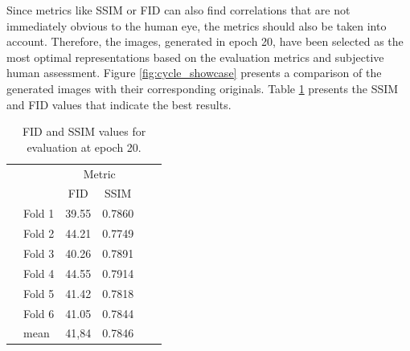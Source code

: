 Since metrics like SSIM or FID can also find correlations that are not immediately obvious to the human eye, the metrics should also be taken into account.
Therefore, the images, generated in epoch 20, have been selected as the most optimal representations based on the evaluation metrics and subjective human assessment.
Figure \ref{fig:cycle_showcase} presents a comparison of the generated images with their corresponding originals.
Table \ref{fid_ssim_cycle_table} presents the SSIM and FID values that indicate the best results.
\begin{table}[!tb]\vspace{1ex}\centering
    \caption[Metrics CycleGAN]{FID and SSIM values for evaluation at epoch 20.\label{fid_ssim_cycle_table}}
    \begin{tabular*}{8cm}{ll|@{\extracolsep\fill}cccc}
    &&\multicolumn{2}{c}{Metric} \\
    && FID & SSIM  \\\hline
    & Fold 1 &  39.55  & 0.7860 \\%
    & Fold 2 & 44.21  &  0.7749 \\%
    & Fold 3 & 40.26  &  0.7891\\%
    & Fold 4 & 44.55  &  0.7914\\%
    & Fold 5 & 41.42  &  0.7818\\%
    & Fold 6 & 41.05 &  0.7844\\\hline
    & mean & 41,84 & 0.7846\\
    \end{tabular*}
    \captionsetup{justification=centering}
\vspace{2ex}\end{table}
